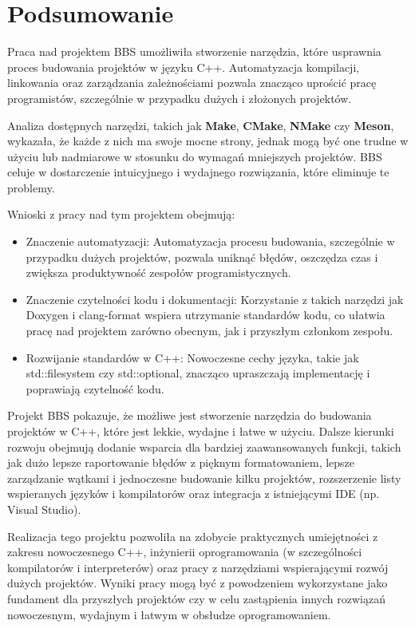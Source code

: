 \chapter{Podsumowanie}
Praca nad projektem BBS umożliwiła stworzenie narzędzia, które usprawnia proces budowania projektów w języku C++. Automatyzacja kompilacji, linkowania oraz zarządzania zależnościami pozwala znacząco uprościć pracę programistów, szczególnie w przypadku dużych i złożonych projektów.

Analiza dostępnych narzędzi, takich jak \textbf{Make}, \textbf{CMake}, \textbf{NMake} czy \textbf{Meson}, wykazała, że każde z nich ma swoje mocne strony, jednak mogą być one trudne w użyciu lub nadmiarowe w stosunku do wymagań mniejszych projektów. BBS celuje w dostarczenie intuicyjnego i wydajnego rozwiązania, które eliminuje te problemy.

Wnioski z pracy nad tym projektem obejmują:
\begin{itemize}
    \item Znaczenie automatyzacji: Automatyzacja procesu budowania, szczególnie w przypadku dużych projektów, pozwala uniknąć błędów, oszczędza czas i zwiększa produktywność zespołów programistycznych.
    \item Znaczenie czytelności kodu i dokumentacji: Korzystanie z takich narzędzi jak Doxygen i clang-format wspiera utrzymanie standardów kodu, co ułatwia pracę nad projektem zarówno obecnym, jak i przyszłym członkom zespołu.
    \item Rozwijanie standardów w C++: Nowoczesne cechy języka, takie jak std::filesystem czy std::optional, znacząco upraszczają implementację i poprawiają czytelność kodu.
\end{itemize}

Projekt BBS pokazuje, że możliwe jest stworzenie narzędzia do budowania projektów w C++, które jest lekkie, wydajne i łatwe w użyciu. Dalsze kierunki rozwoju obejmują dodanie wsparcia dla bardziej zaawansowanych funkcji, takich jak dużo lepsze raportowanie błędów z pięknym formatowaniem, lepsze zarządzanie wątkami i jednoczesne budowanie kilku projektów, rozszerzenie listy wspieranych języków i kompilatorów oraz integracja z istniejącymi IDE (np. Visual Studio).

Realizacja tego projektu pozwoliła na zdobycie praktycznych umiejętności z zakresu nowoczesnego C++, inżynierii oprogramowania (w szczególności kompilatorów i interpreterów) oraz pracy z narzędziami wspierającymi rozwój dużych projektów. Wyniki pracy mogą być z powodzeniem wykorzystane jako fundament dla przyszłych projektów czy w celu zastąpienia innych rozwiązań nowoczesnym, wydajnym i łatwym w obsłudze oprogramowaniem.